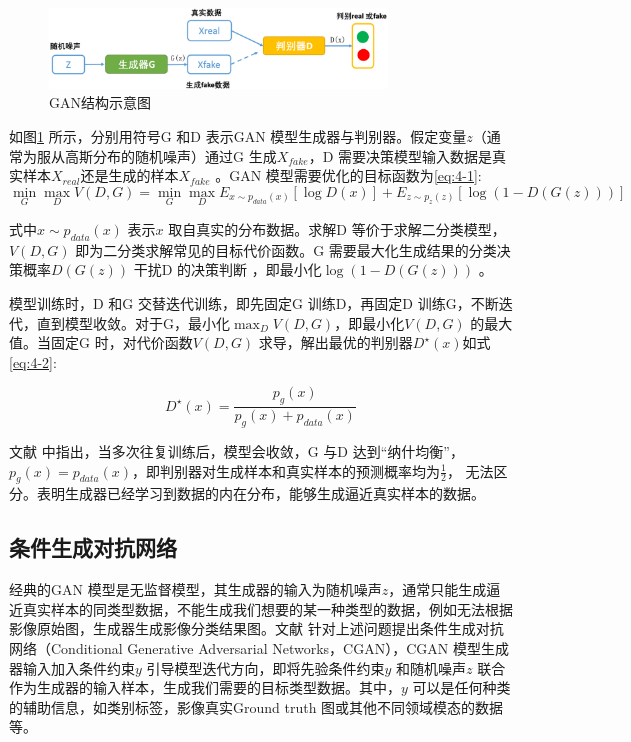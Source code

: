 \begin{figure}[htb]
  \centering
  \includegraphics[width=0.8\textwidth]{figures/gan}
  \caption{GAN结构示意图}\label{fig:gan}
\end{figure}

如图\ref{fig:gan} 所示，分别用符号G 和D 表示GAN 模型生成器与判别器。假定变量$z$（通常为服从高斯分布的随机噪声）通过G 生成$X_{fake}$，D 需要决策模型输入数据是真实样本$X_{real}$还是生成的样本$X_{fake}$ 。GAN 模型需要优化的目标函数为\ref{eq:4-1}:
\begin{equation}
  \label{eq:4-1}
  \mathop{\min}_{G} \mathop{\max}_{D} V(D,G) = \mathop{\min}_{G} \mathop{\max}_{D} E_{x \sim p_{data}(x)} [\log D(x)] + E_{z \sim p_{z}(z)}[ \log (1-D(G(z)))]
\end{equation}

式中$x \sim p_{data}(x)$ 表示$x$ 取自真实的分布数据。求解D 等价于求解二分类模型，$ V(D,G)$ 即为二分类求解常见的目标代价函数。G 需要最大化生成结果的分类决策概率$D(G(z))$ 干扰D 的决策判断 ，即最小化$\log (1-D(G(z)))$ 。

模型训练时，D 和G 交替迭代训练，即先固定G 训练D，再固定D 训练G，不断迭代，直到模型收敛。对于G，最小化$\mathop{\max}_{D} V(D,G) $，即最小化$V(D,G)$ 的最大值。当固定G 时，对代价函数$V(D,G)$ 求导，解出最优的判别器$D^{\star}(x)$如式\ref{eq:4-2}:

\begin{equation}
  \label{eq:4-2}
  D^{\star}(x) = \frac{p_g(x)}{p_g(x)+p_{data}(x)}
\end{equation}

文献\cite{goodfellow2014generative} 中指出，当多次往复训练后，模型会收敛，G 与D 达到“纳什均衡”，$p_g(x) = p_{data}(x)$，即判别器对生成样本和真实样本的预测概率均为$\frac{1}{2}$， 无法区分。表明生成器已经学习到数据的内在分布，能够生成逼近真实样本的数据。


\subsection{条件生成对抗网络}
\label{sec:first-2}
经典的GAN 模型是无监督模型，其生成器的输入为随机噪声$z$，通常只能生成逼近真实样本的同类型数据，不能生成我们想要的某一种类型的数据，例如无法根据影像原始图，生成器生成影像分类结果图。文献\cite{mirza2014conditional} 针对上述问题提出条件生成对抗网络（Conditional Generative Adversarial Networks，CGAN），CGAN 模型生成器输入加入条件约束$y$ 引导模型迭代方向，即将先验条件约束$y$ 和随机噪声$z$ 联合作为生成器的输入样本，生成我们需要的目标类型数据。其中，$y$ 可以是任何种类的辅助信息，如类别标签，影像真实Ground truth 图或其他不同领域模态的数据等。

